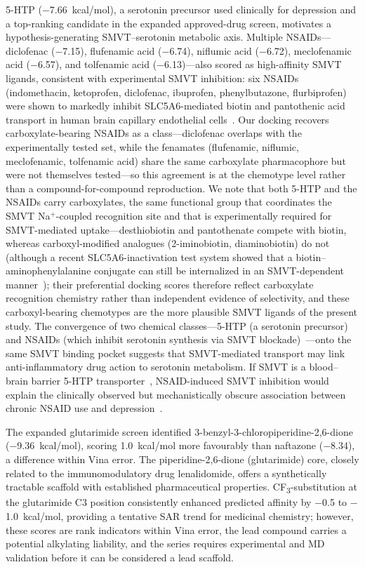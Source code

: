 \documentclass[10pt,letterpaper]{article}
\begin{document}
5-HTP ($-$7.66~kcal/mol), a serotonin precursor used clinically for depression and a top-ranking candidate in the expanded approved-drug screen, motivates a hypothesis-generating SMVT--serotonin metabolic axis. Multiple NSAIDs---diclofenac ($-$7.15), flufenamic acid ($-$6.74), niflumic acid ($-$6.72), meclofenamic acid ($-$6.57), and tolfenamic acid ($-$6.13)---also scored as high-affinity SMVT ligands, consistent with experimental SMVT inhibition: six NSAIDs (indomethacin, ketoprofen, diclofenac, ibuprofen, phenylbutazone, flurbiprofen) were shown to markedly inhibit SLC5A6-mediated biotin and pantothenic acid transport in human brain capillary endothelial cells~\cite{uchida2015}. Our docking recovers carboxylate-bearing NSAIDs as a class---diclofenac overlaps with the experimentally tested set, while the fenamates (flufenamic, niflumic, meclofenamic, tolfenamic acid) share the same carboxylate pharmacophore but were not themselves tested---so this agreement is at the chemotype level rather than a compound-for-compound reproduction. We note that both 5-HTP and the NSAIDs carry carboxylates, the same functional group that coordinates the SMVT \mbox{Na$^+$}-coupled recognition site and that is experimentally required for SMVT-mediated uptake---desthiobiotin and pantothenate compete with biotin, whereas carboxyl-modified analogues (2-iminobiotin, diaminobiotin) do not~\cite{tripathi2025,park2005} (although a recent SLC5A6-inactivation test system showed that a biotin--aminophenylalanine conjugate can still be internalized in an SMVT-dependent manner~\cite{rudenko2025}); their preferential docking scores therefore reflect carboxylate recognition chemistry rather than independent evidence of selectivity, and these carboxyl-bearing chemotypes are the more plausible SMVT ligands of the present study. The convergence of two chemical classes---5-HTP (a serotonin precursor) and NSAIDs (which inhibit serotonin synthesis via SMVT blockade)~\cite{shaikh2023}---onto the same SMVT binding pocket suggests that SMVT-mediated transport may link anti-inflammatory drug action to serotonin metabolism. If SMVT is a blood--brain barrier 5-HTP transporter~\cite{hardebo1979,agren1991}, NSAID-induced SMVT inhibition would explain the clinically observed but mechanistically obscure association between chronic NSAID use and depression~\cite{shaikh2023}.

The expanded glutarimide screen identified 3-benzyl-3-chloropiperidine-2,6-dione ($-$9.36~kcal/mol), scoring 1.0~kcal/mol more favourably than naftazone ($-$8.34), a difference within Vina error. The piperidine-2,6-dione (glutarimide) core, closely related to the immunomodulatory drug lenalidomide, offers a synthetically tractable scaffold with established pharmaceutical properties. CF\textsubscript{3}-substitution at the glutarimide C3 position consistently enhanced predicted affinity by $-$0.5 to $-$1.0~kcal/mol, providing a tentative SAR trend for medicinal chemistry; however, these scores are rank indicators within Vina error, the lead compound carries a potential alkylating liability, and the series requires experimental and MD validation before it can be considered a lead scaffold.
\end{document}

